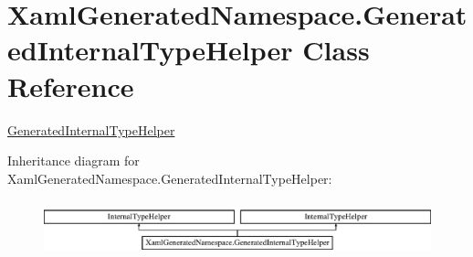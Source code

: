 \hypertarget{class_xaml_generated_namespace_1_1_generated_internal_type_helper}{\section{Xaml\-Generated\-Namespace.\-Generated\-Internal\-Type\-Helper Class Reference}
\label{class_xaml_generated_namespace_1_1_generated_internal_type_helper}
}


\hyperlink{class_xaml_generated_namespace_1_1_generated_internal_type_helper}{Generated\-Internal\-Type\-Helper}  


Inheritance diagram for Xaml\-Generated\-Namespace.\-Generated\-Internal\-Type\-Helper\-:\begin{figure}[H]
\begin{center}
\leavevmode
\includegraphics[height=1.627907cm]{class_xaml_generated_namespace_1_1_generated_internal_type_helper}
\end{center}
\end{figure}
